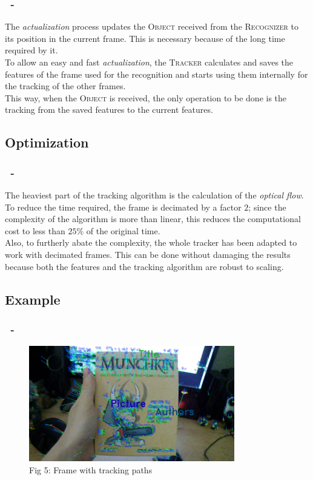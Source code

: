 \documentclass{beamer}
\begin{document}
  \begin{frame}
    \frametitle{\insertsection\ - \insertsubsection}
    The \emph{actualization} process updates the \textsc{Object} received from
    the \textsc{Recognizer} to its position in the current frame. This is
    necessary because of the long time required by it.\\
    To allow an easy and fast \emph{actualization}, the \textsc{Tracker}
    calculates and saves the features of the frame used for the recognition
    and starts using them internally for the tracking of the other frames.\\
    This way, when the \textsc{Object} is received, the only operation to be
    done is the tracking from the saved features to the current features.\\
  \end{frame}
  
  \subsection{Optimization}

  \begin{frame}
    \frametitle{\insertsection\ - \insertsubsection}
    The heaviest part of the tracking algorithm is the calculation of the
    \emph{optical flow}. To reduce the time required, the frame is
    decimated by a factor $2$; since the complexity of the algorithm is
    more than linear, this reduces the computational cost to less than
    $25\%$ of the original time.\\
    Also, to furtherly abate the complexity, the whole tracker has been
    adapted to work with decimated frames. This can be done without damaging
    the results because both the features and the tracking algorithm are
    robust to scaling.\\
  \end{frame}

  \subsection{Example}

  \begin{frame}
    \frametitle{\insertsection\ - \insertsubsection}
	\begin{figure}
		\centering
		\includegraphics[width=0.8\textwidth]{images/sampleTracking.jpg}\\
		Fig 5: Frame with tracking paths
	\end{figure}
  \end{frame}
\end{document}
